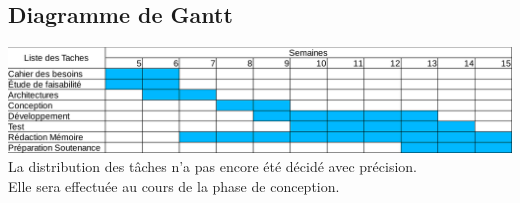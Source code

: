 \documentclass[12pt,a4paper]{article}
\begin{document}
\subsection{Diagramme de Gantt}
\includegraphics[scale=0.40]{Gantt.png}
La distribution des tâches n'a pas encore été décidé avec précision.\\ Elle sera effectuée au cours de la phase de conception.
\end{document}
